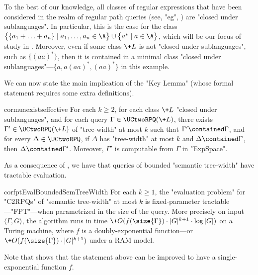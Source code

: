 To the best of our knowledge,
all classes of regular expressions that have been considered in the realm of regular path queries (see, "eg", \cite[\S1]{FigueiraGKMNT20}) are "closed under sublanguages". In particular, this is
the case for the class $\bigl\{ \{a_1+\hdots+a_n\} \mid a_1,\hdots,a_n
\in \A \bigr\} \cup \bigl\{ a^* \mid a \in \A \bigr\}$, which will be our focus of study in . Moreover, even if some class $\+L$
is not "closed under sublanguages", such as $\{(aa)^*\}$,
then it is contained in a minimal class "closed under sublanguages"---$\{a, a(aa)^*, (aa)^*\}$ in 
this example.

We can now state the main implication of the "Key Lemma" (whose formal statement requires some extra definitions).
\begin{restatable*}{cor}{muaexistseffective}
    \AP\label{cor:mua-exists-effective}
    For each $k \geq 2$, for each class $\+L$ "closed under sublanguages",
    and for each query $\Gamma \in \UCtwoRPQ(\+L)$,
    there exists $\Gamma' \in \UCtwoRPQ(\+L)$ of "tree-width" at most $k$ 
    such that
    $\Gamma' \contained \Gamma$, and for every $\Delta \in \UCtwoRPQ$, if $\Delta$ has
    "tree-width" at most $k$ and $\Delta \contained \Gamma$, then $\Delta \contained \Gamma'$.
    Moreover, $\Gamma'$ is computable from $\Gamma$ in "ExpSpace".
\end{restatable*}

As a consequence of , we have that queries of bounded "semantic tree-width" have tractable evaluation.
\begin{restatable*}{cor}{fptEvalBoundedSemTreeWidth}
	\AP\label{coro:fpt-eval-bounded-semtreewidth}
	For each $k\geq 1$, the "evaluation problem" for "C2RPQs" of "semantic tree-width"
	at most $k$ is fixed-parameter tractable---"FPT"---when parametrized in the size of
	the query. More precisely on input $\langle \Gamma, G \rangle$,
	the algorithm runs in time
	$\+O(f(\size{\Gamma})\cdot |G|^{k+1} \cdot \log{|G|})$ on a Turing machine, where $f$ is a doubly-exponential function---or $\+O(f(\size{\Gamma})\cdot |G|^{k+1})$ under a RAM model.
\end{restatable*}
Note that \cite[Theorem~22]{FGM24} shows that the statement above can be improved to have a single-exponential function $f$.

